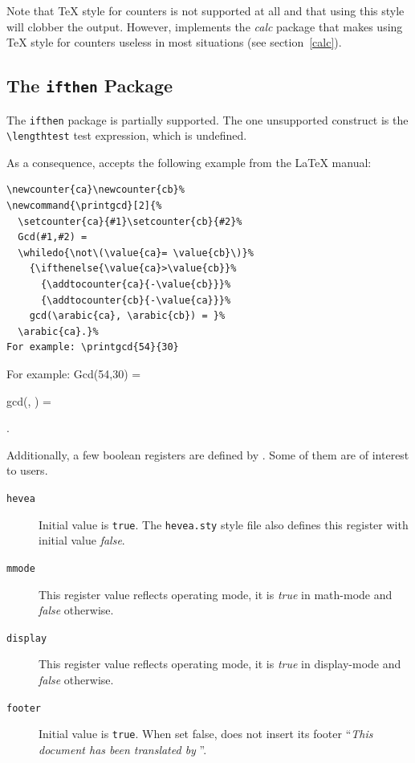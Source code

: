 Note that \TeX{} style for counters is not supported at all and that using
this style will clobber the output. However, \hevea{} implements
the \textit{calc} package that makes using \TeX{} style for counters
useless in most situations (see section~\ref{calc}).


\subsection{The \texttt{ifthen} Package}\label{ifthen}
The \texttt{ifthen} package is partially supported.
The one unsupported construct is the
\verb+\lengthtest+ test expression, which is
undefined.

As a consequence, \hevea{} accepts the following example from the
\LaTeX{} manual:
\begin{verbatim}
\newcounter{ca}\newcounter{cb}%
\newcommand{\printgcd}[2]{%
  \setcounter{ca}{#1}\setcounter{cb}{#2}%
  Gcd(#1,#2) =
  \whiledo{\not\(\value{ca}= \value{cb}\)}%
    {\ifthenelse{\value{ca}>\value{cb}}%
      {\addtocounter{ca}{-\value{cb}}}%
      {\addtocounter{cb}{-\value{ca}}}%
    gcd(\arabic{ca}, \arabic{cb}) = }%
  \arabic{ca}.}%
For example: \printgcd{54}{30}
\end{verbatim}
%
\newcommand{\printgcd}[2]{%
  \setcounter{ca}{#1}\setcounter{cb}{#2}%
  Gcd(#1,#2) =
  \whiledo{\not\(\value{ca}= \value{cb}\)}%
    {\ifthenelse{\value{ca}>\value{cb}}%
      {\addtocounter{ca}{-\value{cb}}}%
      {\addtocounter{cb}{-\value{ca}}}%
    gcd(\arabic{ca}, ) = }%
  .}%
For example: \printgcd{54}{30}

Additionally, a few boolean registers are defined by \hevea{}.
Some of them are of interest to users.
\begin{description}
\item[\texttt{hevea}] Initial value is \texttt{true}.
The \texttt{hevea.sty} style file also defines this register with
initial value \textit{false}.
\item[\texttt{mmode}] This register value reflects \hevea{} operating
mode, it is \textit{true} in math-mode and \textit{false} otherwise.
\item[\texttt{display}]  This register value reflects \hevea{} operating
mode, it is \textit{true} in display-mode and \textit{false} otherwise.
\item[\texttt{footer}] Initial value is  \texttt{true}.
When set false, \hevea{} does not insert its footer ``\emph{This
document has been translated by \hevea}''.

\end{description}

